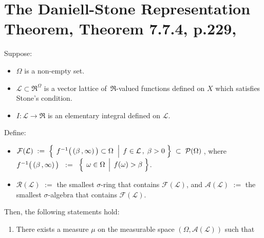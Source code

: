 

\section{The Daniell-Stone Representation Theorem, Theorem 7.7.4, p.229, \cite{Cohn2013}}
\setcounter{theorem}{0}
\setcounter{equation}{0}


\renewcommand{\theenumi}{\roman{enumi}}
\renewcommand{\labelenumi}{\textnormal{(\theenumi)}$\;\;$}


\begin{theorem}
\label{DaniellStoneTheorem}
\mbox{}\vskip 0.1cm
\noindent
Suppose:
\begin{itemize}
\item
	$\Omega$ is a non-empty set.
\item
	$\mathcal{L} \subset \Re^{\Omega}$ is a vector lattice of \,$\Re$-valued functions defined on $X$
	which satisfies Stone's condition.
\item
	$I : \mathcal{L} \longrightarrow \Re$ is an elementary integral defined on $\mathcal{L}$.
\end{itemize}
Define:
\begin{itemize}
\item
	$\mathcal{F}(\mathcal{L})
	\; := \;
		\left\{\;
		\left.
		f^{-1}\!\left(\,(\beta\overset{{\color{white}+}}{,}\infty)\,\right) \overset{{\color{white}.}}{\subset} \Omega
		\;\;\right\vert\;
		f \in \mathcal{L}\,,\; \beta > 0
		\;\right\}
	\; \subset \;
		\mathcal{P}(\Omega)$\,,
	where
	\,$f^{-1}\!\left(\,(\beta\overset{{\color{white}+}}{,}\infty)\,\right)$
	\,$:=$\, $\left\{\;\left.\omega\overset{{\color{white}.}}{\in}\Omega \,\;\right\vert\; f(\omega) > \beta \;\right\}$.
\item
	$\mathcal{R}(\mathcal{L})$ $:=$ the smallest $\sigma$-ring that contains $\mathcal{F}(\mathcal{L})$, and
	$\mathcal{A}(\mathcal{L})$ $:=$ the smallest $\sigma$-algebra that contains $\mathcal{F}(\mathcal{L})$.
\end{itemize}
Then, the following statements hold:
\begin{enumerate}
\item
	There exists a measure $\mu$ on the measurable space $(\Omega,\mathcal{A}(\mathcal{L}))$ such that

\end{enumerate}
\end{theorem}
